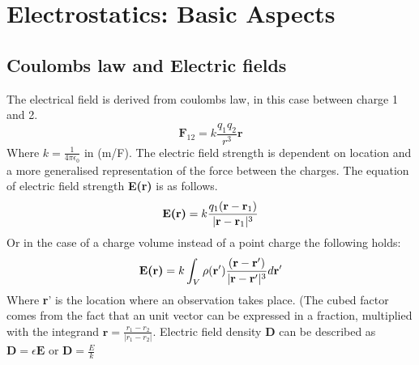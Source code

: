 \chapter{Electrostatics: Basic Aspects}
\section{Coulombs law and Electric fields}
The electrical field is derived from coulombs law, in this case between charge 1 and 2.
\begin{equation}
    \textbf{F}_{12} = k\frac{q_1q_2}{r^3}\textbf{r}
\end{equation}
Where $k = \frac{1}{4\pi \epsilon_0}$ in (m/F). The electric field strength is dependent on location and a more generalised representation of the force between the charges. The equation of electric field strength \textbf{E(\textbf{r})} is as follows.
\begin{equation}
    \textbf{E\textbf{(r)}} = k \frac{q_1(\textbf{r}-\textbf{r}_1)}{|\textbf{r}-\textbf{r}_1|^3}
\end{equation}
Or in the case of a charge volume instead of a point charge the following holds:
\begin{equation}
    \textbf{E(\textbf{r})} = k \int_V \rho(\textbf{r}')\frac{(\textbf{r}-\textbf{r}')}{|\textbf{r}-\textbf{r}'|^3}d\textbf{r}'
\end{equation}
Where \textbf{r}' is the location where an observation takes place. (The cubed factor comes from the fact that an unit vector can be expressed in a fraction, multiplied with the integrand $\displaystyle \textbf{r} = \frac{r_1-r_2}{|r_1-r_2|}$. Electric field density \textbf{D} can be described as $\textbf{D} = \epsilon \textbf{E}$ or $\textbf{D} = \frac{E}{k}$
